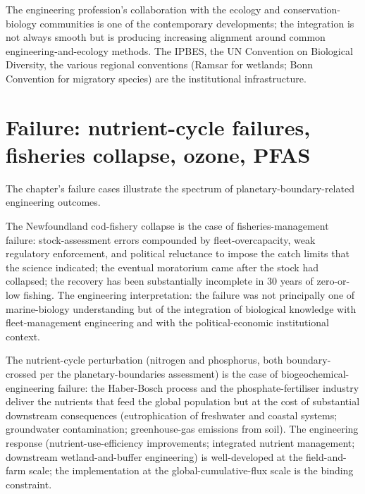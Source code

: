 The engineering profession's collaboration with the ecology and conservation-biology communities is one of the contemporary developments; the integration is not always smooth but is producing increasing alignment around common engineering-and-ecology methods. The IPBES, the UN Convention on Biological Diversity, the various regional conventions (Ramsar for wetlands; Bonn Convention for migratory species) are the institutional infrastructure.

\section{Failure: nutrient-cycle failures, fisheries collapse, ozone, PFAS}

The chapter's failure cases illustrate the spectrum of planetary-boundary-related engineering outcomes.

The Newfoundland cod-fishery collapse \cite{paper:myers-cod-2007} is the case of fisheries-management failure: stock-assessment errors compounded by fleet-overcapacity, weak regulatory enforcement, and political reluctance to impose the catch limits that the science indicated; the eventual moratorium came after the stock had collapsed; the recovery has been substantially incomplete in $30$ years of zero-or-low fishing. The engineering interpretation: the failure was not principally one of marine-biology understanding but of the integration of biological knowledge with fleet-management engineering and with the political-economic institutional context.

The nutrient-cycle perturbation (nitrogen and phosphorus, both boundary-crossed per the planetary-boundaries assessment) is the case of biogeochemical-engineering failure: the Haber-Bosch process and the phosphate-fertiliser industry deliver the nutrients that feed the global population but at the cost of substantial downstream consequences (eutrophication of freshwater and coastal systems; groundwater contamination; greenhouse-gas emissions from soil). The engineering response (nutrient-use-efficiency improvements; integrated nutrient management; downstream wetland-and-buffer engineering) is well-developed at the field-and-farm scale; the implementation at the global-cumulative-flux scale is the binding constraint.

